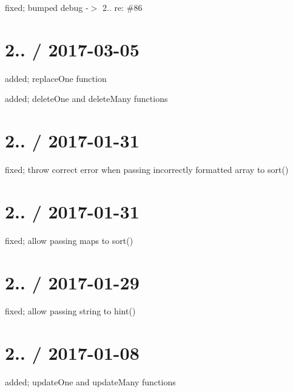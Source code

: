 \begin{DoxyItemize}
\item fixed; bumped debug -\/$>$ 2.. re\+: \#86
\end{DoxyItemize}

\section*{2.. / 2017-\/03-\/05 }


\begin{DoxyItemize}
\item added; replace\+One function
\item added; delete\+One and delete\+Many functions
\end{DoxyItemize}

\section*{2.. / 2017-\/01-\/31 }


\begin{DoxyItemize}
\item fixed; throw correct error when passing incorrectly formatted array to sort()
\end{DoxyItemize}

\section*{2.. / 2017-\/01-\/31 }


\begin{DoxyItemize}
\item fixed; allow passing maps to sort()
\end{DoxyItemize}

\section*{2.. / 2017-\/01-\/29 }


\begin{DoxyItemize}
\item fixed; allow passing string to hint()
\end{DoxyItemize}

\section*{2.. / 2017-\/01-\/08 }


\begin{DoxyItemize}
\item added; update\+One and update\+Many functions
\end{DoxyItemize}

